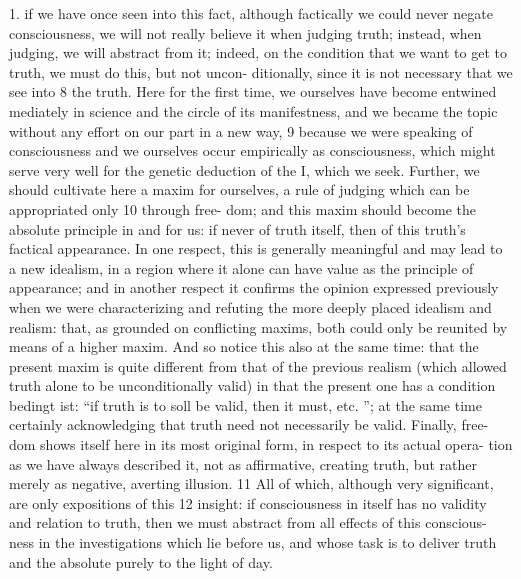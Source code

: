 1. if we have once seen into this fact, although
factically we could never negate consciousness, we will not really believe it
when judging truth; instead, when judging, we will abstract from it; indeed,
on the condition that we want to get to truth, we must do this, but not uncon-
ditionally, since it is not necessary that we see into 8 the truth.
Here for the first
time, we ourselves have become entwined mediately in science and the circle of
its manifestness, and we became the topic without any effort on our part in a
new way, 9 because we were speaking of consciousness and we ourselves occur
empirically as consciousness, which might serve very well for the genetic
deduction of the I, which we seek.
Further, we should cultivate here a maxim
for ourselves, a rule of judging which can be appropriated only 10 through free-
dom; and this maxim should become the absolute principle in and
for us: if never of truth itself, then of this truth’s factical appearance.
In one
respect, this is generally meaningful and may lead to a new idealism, in a
region where it alone can have value as the principle of appearance; and in
another respect it confirms the opinion expressed previously when we were
characterizing and refuting the more deeply placed idealism and realism: that,
as grounded on conflicting maxims, both could only be reunited by means of
a higher maxim.
And so notice this also at the same time: that the present
maxim is quite different from that of the previous realism (which allowed
truth alone to be unconditionally valid) in that the present one has a condition
{bedingt ist}: “if truth is to {soll} be valid, then it must, etc.
”; at the same time
certainly acknowledging that truth need not necessarily be valid.
Finally, free-
dom shows itself here in its most original form, in respect to its actual opera-
tion as we have always described it, not as affirmative, creating truth, but rather
merely as negative, averting illusion.
11 All of which, although very significant,
are only expositions of this 12 insight: if consciousness in itself has no validity
and relation to truth, then we must abstract from all effects of this conscious-
ness in the investigations which lie before us, and whose task is to deliver truth
and the absolute purely to the light of day.

